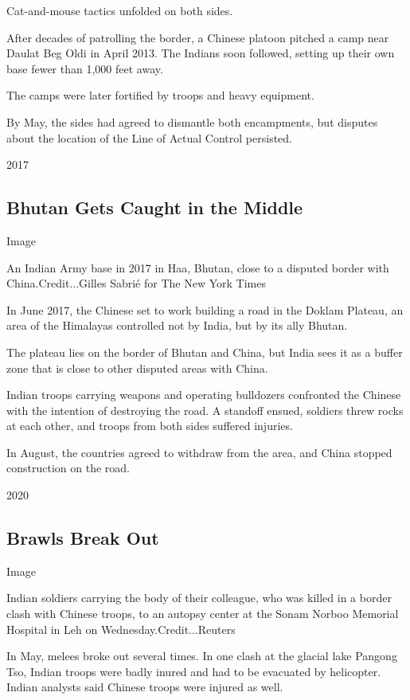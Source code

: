 Cat-and-mouse tactics unfolded on both sides.

After decades of patrolling the border, a Chinese platoon pitched a camp
near Daulat Beg Oldi in April 2013. The Indians soon followed, setting
up their own base fewer than 1,000 feet away.

The camps were later fortified by troops and heavy equipment.

By May, the sides had agreed to dismantle both encampments, but disputes
about the location of the Line of Actual Control persisted.

2017

\hypertarget{bhutan-gets-caught-in-the-middle}{%
\subsection{Bhutan Gets Caught in the
Middle}\label{bhutan-gets-caught-in-the-middle}}

Image

An Indian Army base in 2017 in Haa, Bhutan, close to a disputed border
with China.Credit...Gilles Sabrié for The New York Times

In June 2017, the Chinese set to work building a road in the Doklam
Plateau, an area of the Himalayas controlled not by India, but by its
ally Bhutan.

The plateau lies on the border of Bhutan and China, but India sees it as
a buffer zone that is close to other disputed areas with China.

Indian troops carrying weapons and operating bulldozers confronted the
Chinese with the intention of destroying the road. A standoff ensued,
soldiers threw rocks at each other, and troops from both sides suffered
injuries.

In August, the countries agreed to withdraw from the area, and China
stopped construction on the road.

2020

\hypertarget{brawls-break-out}{%
\subsection{Brawls Break Out}\label{brawls-break-out}}

Image

Indian soldiers carrying the body of their colleague, who was killed in
a border clash with Chinese troops, to an autopsy center at the Sonam
Norboo Memorial Hospital in Leh on Wednesday.Credit...Reuters

In May, melees broke out several times. In one clash at the glacial lake
Pangong Tso, Indian troops were badly inured and had to be evacuated by
helicopter. Indian analysts said Chinese troops were injured as well.

